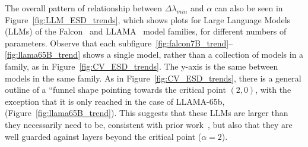 The overall pattern of relationship between $\Delta\lambda_{min}$ and $\alpha$ can also be seen in 
Figure~\ref{fig:LLM_ESD_trends}, which shows plots for Large Language Models (LLMs) of the Falcon~\cite{falcon40b} and 
LLAMA~\cite{touvron2023_TR} model families, for different numbers of parameters. Observe that each 
subfigure~\ref{fig:falcon7B_trend}--\ref{fig:llama65B_trend} shows a single 
model, rather than a collection of models in a family, as in Figure~\ref{fig:CV_ESD_trends}.
The y-axis is the same between models in the same family. 
As in Figure~\ref{fig:CV_ESD_trends}, there is a general outline of a ``funnel shape pointing towards the critical 
point $(2, 0)$, with the exception that it is only reached in the case of LLAMA-65b, (Figure~\ref{fig:llama65B_trend}). 
This suggests that these LLMs are larger than they necessarily need to be, consistent with prior work~\cite{YHTx21_TR}, 
but also that they are well guarded against \OverRegularized layers beyond the critical point
($\alpha=2$). 


